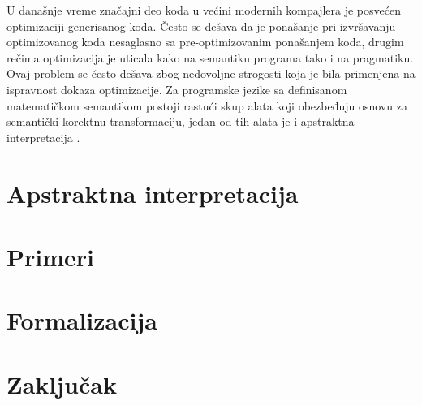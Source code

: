 \documentclass[a4paper]{article}
\begin{document}
U današnje vreme značajni deo koda u većini modernih kompajlera je posvećen optimizaciji generisanog koda. Često se dešava da je ponašanje pri izvršavanju optimizovanog koda nesaglasno sa pre-optimizovanim ponašanjem koda, drugim rečima optimizacija je uticala kako na semantiku programa tako i na pragmatiku. Ovaj problem se često dešava zbog nedovoljne strogosti koja je bila primenjena na ispravnost dokaza optimizacije. Za programske jezike sa definisanom matematičkom semantikom postoji rastući skup alata koji obezbeđuju osnovu za semantički korektnu transformaciju, jedan od tih alata je i apstraktna interpretacija \cite{AbramskyHankin}. \\



\section{Apstraktna interpretacija}
\label{sec:Apstraktna interpretacija}





\section{Primeri}
\label{sec:Primeri}


\section{Formalizacija} 
\label{sec:Formalizacija}


\section{Zaključak}
\label{sec:zakljucak}
 


\appendix
 

\end{document}
